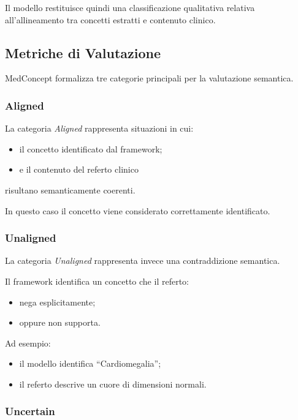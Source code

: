 Il modello restituisce quindi una classificazione qualitativa relativa all'allineamento tra concetti estratti e contenuto clinico.

\subsection{Metriche di Valutazione}

MedConcept formalizza tre categorie principali per la valutazione semantica.

\subsubsection{Aligned}

La categoria \textit{Aligned} rappresenta situazioni in cui:

\begin{itemize}
    \item il concetto identificato dal framework;
    \item e il contenuto del referto clinico
\end{itemize}

risultano semanticamente coerenti.

In questo caso il concetto viene considerato correttamente identificato.

\subsubsection{Unaligned}

La categoria \textit{Unaligned} rappresenta invece una contraddizione semantica.

Il framework identifica un concetto che il referto:

\begin{itemize}
    \item nega esplicitamente;
    \item oppure non supporta.
\end{itemize}

Ad esempio:

\begin{itemize}
    \item il modello identifica ``Cardiomegalia'';
    \item il referto descrive un cuore di dimensioni normali.
\end{itemize}

\subsubsection{Uncertain}

